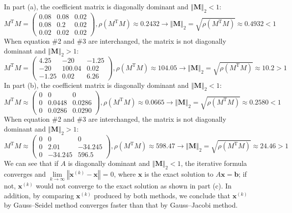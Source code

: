 \documentclass[10pt]{report}
\newcommand{\norm}[2][\infty] {\left\Vert \mathbf{#2} \right\Vert_#1}
\begin{document}
\begin{enumerate}
\begin{enumerate}
		In part (a), the coefficient matrix is diagonally dominant and $\norm[2]{M} < 1$:
		\[
		M^\mathrm{T}M = \begin{pmatrix}
		0.08 & 0.08 & 0.02\\
		0.08 & 0.2 & 0.02\\
		0.02 & 0.02 & 0.02
		\end{pmatrix}, 
		\rho(M^\mathrm{T}M) \approx 0.2432
		\to \norm[2]{M} = \sqrt{\rho(M^\mathrm{T}M)} \approx 0.4932 < 1
		\]
		When equation \#2 and \#3 are interchanged, the matrix is not diagonally dominant and $\norm[2]{M} > 1$:
		\[
		M^\mathrm{T}M = \begin{pmatrix}
		4.25 & -20 & -1.25\\
		-20 & 100.04 & 0.02\\
		-1.25 & 0.02 & 6.26
		\end{pmatrix}, 
		\rho(M^\mathrm{T}M) \approx 104.05
		\to \norm[2]{M} = \sqrt{\rho(M^\mathrm{T}M)} \approx 10.2 > 1
		\]
		In part (b), the coefficient matrix is diagonally dominant and $\norm[2]{M} < 1$:
		\[
		M^\mathrm{T}M \approx \begin{pmatrix}
		0 & 0 & 0\\
		0 & 0.0448 & 0.0286\\
		0 & 0.0286 & 0.0290
		\end{pmatrix}, 
		\rho(M^\mathrm{T}M) \approx 0.0665
		\to \norm[2]{M} = \sqrt{\rho(M^\mathrm{T}M)} \approx 0.2580 < 1
		\]
		When equation \#2 and \#3 are interchanged, the matrix is not diagonally dominant and $\norm[2]{M} > 1$:
		\[
		M^\mathrm{T}M \approx \begin{pmatrix}
		0 & 0 & 0\\
		0 & 2.01 & -34.245\\
		0 & -34.245 & 596.5
		\end{pmatrix}, 
		\rho(M^\mathrm{T}M) \approx 598.47
		\to \norm[2]{M} = \sqrt{\rho(M^\mathrm{T}M)} \approx 24.46 > 1
		\]
		We can see that if $A$ is diagonally dominant and $\norm[2]{M} < 1$, the iterative formula converges and $\lim\limits_{k\to \infty} \left\Vert \mathbf{x}^{(k)} - \mathbf{x} \right\Vert$ = 0, where $\mathbf{x}$ is the exact solution to $A\mathbf{x} = \mathbf{b}$; if not, $\mathbf{x}^{(k)}$ would not converge to the exact solution as shown in part (c). In addition, by comparing $\mathbf{x}^{(k)}$ produced by both methods, we conclude that $\mathbf{x}^{(k)}$ by Gauss--Seidel method converges faster than that by Gauss--Jacobi method.
		
	\end{enumerate}


\end{enumerate}
\end{document}
